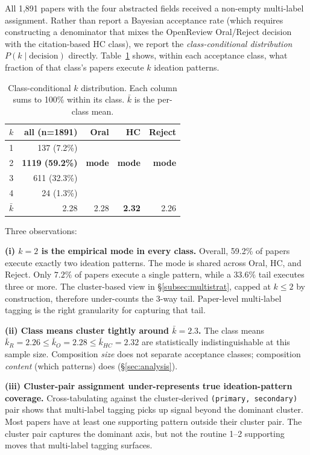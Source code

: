 \documentclass[10pt,a4paper]{article}
\begin{document}
All 1{,}891 papers with the four abstracted fields received a non-empty multi-label assignment. Rather than report a Bayesian acceptance rate (which requires constructing a denominator that mixes the OpenReview Oral/Reject decision with the citation-based HC class), we report the \emph{class-conditional distribution} \(P(k \mid \text{decision})\) directly. Table~\ref{tab:k_dist} shows, within each acceptance class, what fraction of that class's papers execute \(k\) ideation patterns.

\begin{table}[!htbp]
\centering
\caption{Class-conditional \(k\) distribution. Each column sums to 100\% within its class. \(\bar{k}\) is the per-class mean.}
\label{tab:k_dist}
\small
\begin{tabular}{c r r r r}
\toprule
\(k\) & all (n=1891) & Oral & HC & Reject \\
\midrule
1 &  137 (7.2\%)  &  ~~  &  ~~  &  ~~  \\
2 & \textbf{1119 (59.2\%)} & \textbf{mode} & \textbf{mode} & \textbf{mode} \\
3 &  611 (32.3\%) &  ~~  &  ~~  &  ~~  \\
4 &   24 (1.3\%)  &  ~~  &  ~~  &  ~~  \\
\midrule
\(\bar{k}\) & 2.28 & 2.28 & \textbf{2.32} & 2.26 \\
\bottomrule
\end{tabular}
\end{table}

Three observations:

\textbf{(i) \(k{=}2\) is the empirical mode in every class.} Overall, 59.2\% of papers execute exactly two ideation patterns. The mode is shared across Oral, HC, and Reject. Only $7.2\%$ of papers execute a single pattern, while a $33.6\%$ tail executes three or more. The cluster-based view in \S\ref{subsec:multistrat}, capped at \(k \leq 2\) by construction, therefore under-counts the 3-way tail. Paper-level multi-label tagging is the right granularity for capturing that tail.

\textbf{(ii) Class means cluster tightly around \(\bar{k}=2.3\).} The class means $\bar{k}_R = 2.26 \leq \bar{k}_O = 2.28 \leq \bar{k}_{HC} = 2.32$ are statistically indistinguishable at this sample size. Composition \emph{size} does not separate acceptance classes; composition \emph{content} (which patterns) does (\S\ref{sec:analysis}).

\textbf{(iii) Cluster-pair assignment under-represents true ideation-pattern coverage.} Cross-tabulating against the cluster-derived \texttt{(primary, secondary)} pair shows that multi-label tagging picks up signal beyond the dominant cluster. Most papers have at least one supporting pattern outside their cluster pair. The cluster pair captures the dominant axis, but not the routine 1--2 supporting moves that multi-label tagging surfaces.
\end{document}

